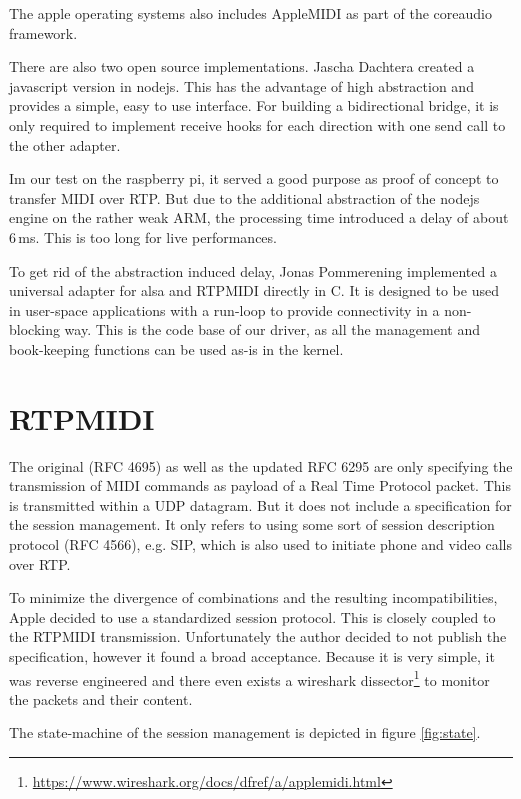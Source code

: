 \documentclass[paper=a4,fontsize=11pt,twocolumn,pagesize,bibtotoc]{scrartcl}
\begin{document}
	The apple operating systems also includes AppleMIDI as part of the coreaudio framework.
	
	There are also two open source implementations. 
	Jascha Dachtera created a javascript version in nodejs. This has the advantage of high abstraction and provides a simple, easy to use interface. For building a bidirectional bridge, it is only required to implement receive hooks for each direction with one send call to the other adapter.
	
	Im our test on the raspberry pi, it served a good purpose as proof of concept to transfer MIDI over RTP. But due to the additional abstraction of the nodejs engine on the rather weak ARM, the processing time introduced a delay of about 6\,ms. This is too long for live performances.
	
	To get rid of the abstraction induced delay, 
	 Jonas Pommerening 
	implemented a universal adapter for alsa and RTPMIDI directly in C. It is designed to be used in user-space applications with a run-loop to provide connectivity in a non-blocking way. This is the code base of our driver, as all the management and book-keeping functions can be used as-is in the kernel.
	
	\section{RTPMIDI}
	The original (RFC 4695\cite{rfc4695}) as well as the updated RFC 6295\cite{rfc6295}
	are only specifying the transmission of MIDI commands as payload of a Real Time Protocol packet. This is transmitted within a UDP datagram. But it does not include a specification for the session management. It only refers to using some sort of session description protocol
	(RFC 4566\cite{rfc4566}), e.g. SIP, which is also used to initiate phone and video calls over RTP.
	
	
	To minimize the divergence of combinations and the resulting incompatibilities, Apple decided to use a standardized session protocol. This is closely coupled to the RTPMIDI transmission. Unfortunately the author decided to not publish the specification, however it found a broad acceptance. Because it is very simple, it was reverse engineered and there even exists a wireshark dissector\footnote{\url{https://www.wireshark.org/docs/dfref/a/applemidi.html}} to monitor the packets and their content.
	
	The state-machine of the session management is depicted in figure \ref{fig:state}.
	
\end{document}
